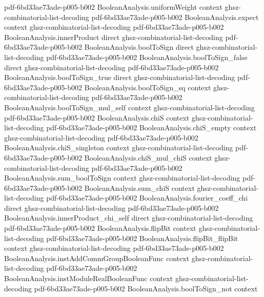 \begin{lemma}
  {pdf-6bd33ae73ade-p005-b002}
\proofstep
  {BooleanAnalysis.uniformWeight}
  {context}
  {ghsz-combinatorial-list-decoding}
  {pdf-6bd33ae73ade-p005-b002}
\proofstep
  {BooleanAnalysis.expect}
  {context}
  {ghsz-combinatorial-list-decoding}
  {pdf-6bd33ae73ade-p005-b002}
\proofstep
  {BooleanAnalysis.innerProduct}
  {direct}
  {ghsz-combinatorial-list-decoding}
  {pdf-6bd33ae73ade-p005-b002}
\proofstep
  {BooleanAnalysis.boolToSign}
  {direct}
  {ghsz-combinatorial-list-decoding}
  {pdf-6bd33ae73ade-p005-b002}
\proofstep
  {BooleanAnalysis.boolToSign_false}
  {direct}
  {ghsz-combinatorial-list-decoding}
  {pdf-6bd33ae73ade-p005-b002}
\proofstep
  {BooleanAnalysis.boolToSign_true}
  {direct}
  {ghsz-combinatorial-list-decoding}
  {pdf-6bd33ae73ade-p005-b002}
\proofstep
  {BooleanAnalysis.boolToSign_sq}
  {context}
  {ghsz-combinatorial-list-decoding}
  {pdf-6bd33ae73ade-p005-b002}
\proofstep
  {BooleanAnalysis.boolToSign_mul_self}
  {context}
  {ghsz-combinatorial-list-decoding}
  {pdf-6bd33ae73ade-p005-b002}
\proofstep
  {BooleanAnalysis.chiS}
  {context}
  {ghsz-combinatorial-list-decoding}
  {pdf-6bd33ae73ade-p005-b002}
\proofstep
  {BooleanAnalysis.chiS_empty}
  {context}
  {ghsz-combinatorial-list-decoding}
  {pdf-6bd33ae73ade-p005-b002}
\proofstep
  {BooleanAnalysis.chiS_singleton}
  {context}
  {ghsz-combinatorial-list-decoding}
  {pdf-6bd33ae73ade-p005-b002}
\proofstep
  {BooleanAnalysis.chiS_mul_chiS}
  {context}
  {ghsz-combinatorial-list-decoding}
  {pdf-6bd33ae73ade-p005-b002}
\proofstep
  {BooleanAnalysis.sum_boolToSign}
  {context}
  {ghsz-combinatorial-list-decoding}
  {pdf-6bd33ae73ade-p005-b002}
\proofstep
  {BooleanAnalysis.sum_chiS}
  {context}
  {ghsz-combinatorial-list-decoding}
  {pdf-6bd33ae73ade-p005-b002}
\proofstep
  {BooleanAnalysis.fourier_coeff_chi}
  {direct}
  {ghsz-combinatorial-list-decoding}
  {pdf-6bd33ae73ade-p005-b002}
\proofstep
  {BooleanAnalysis.innerProduct_chi_self}
  {direct}
  {ghsz-combinatorial-list-decoding}
  {pdf-6bd33ae73ade-p005-b002}
\proofstep
  {BooleanAnalysis.flipBit}
  {context}
  {ghsz-combinatorial-list-decoding}
  {pdf-6bd33ae73ade-p005-b002}
\proofstep
  {BooleanAnalysis.flipBit_flipBit}
  {context}
  {ghsz-combinatorial-list-decoding}
  {pdf-6bd33ae73ade-p005-b002}
\proofstep
  {BooleanAnalysis.instAddCommGroupBooleanFunc}
  {context}
  {ghsz-combinatorial-list-decoding}
  {pdf-6bd33ae73ade-p005-b002}
\proofstep
  {BooleanAnalysis.instModuleRealBooleanFunc}
  {context}
  {ghsz-combinatorial-list-decoding}
  {pdf-6bd33ae73ade-p005-b002}
\proofstep
  {BooleanAnalysis.boolToSign_not}
  {context}

\end{lemma}
